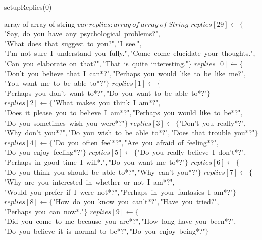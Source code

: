 \documentclass[a4paper,10pt]{article}
\begin{document}
\begin{algorithm}
\caption{setupReplies(0)}
\begin{algorithmic}[5]
\State {}
\State {}
\State {}
    \State array of array of string
  \EndDecl
  \State \(var\ replies:array\ of\ array\ of\ String\)
  \State {}
  \State {}
  \State \(replies[29]\gets\{\)"{}Say,\ do\ you\ have\ any\ psychological\ problems?"{}\(,\)"{}What\ does\ that\ suggest\ to\ you?"{}\(,\)"{}I\ see."{}\(,\)"{}I'{}m\ not\ sure\ I\ understand\ you\ fully."{}\(,\)"{}Come\ come\ elucidate\ your\ thoughts."{}\(,\)"{}Can\ you\ elaborate\ on\ that?"{}\(,\)"{}That\ is\ quite\ interesting."{}\(\}\)
  \State \(replies[0]\gets\{\)"{}Don'{}t\ you\ believe\ that\ I\ can*?"{}\(,\)"{}Perhaps\ you\ would\ like\ to\ be\ like\ me?"{}\(,\)"{}You\ want\ me\ to\ be\ able\ to*?"{}\(\}\)
  \State \(replies[1]\gets\{\)"{}Perhaps\ you\ don'{}t\ want\ to*?"{}\(,\)"{}Do\ you\ want\ to\ be\ able\ to*?"{}\(\}\)
  \State \(replies[2]\gets\{\)"{}What\ makes\ you\ think\ I\ am*?"{}\(,\)"{}Does\ it\ please\ you\ to\ believe\ I\ am*?"{}\(,\)"{}Perhaps\ you\ would\ like\ to\ be*?"{}\(,\)"{}Do\ you\ sometimes\ wish\ you\ were*?"{}\(\}\)
  \State \(replies[3]\gets\{\)"{}Don'{}t\ you\ really*?"{}\(,\)"{}Why\ don'{}t\ you*?"{}\(,\)"{}Do\ you\ wish\ to\ be\ able\ to*?"{}\(,\)"{}Does\ that\ trouble\ you*?"{}\(\}\)
  \State \(replies[4]\gets\{\)"{}Do\ you\ often\ feel*?"{}\(,\)"{}Are\ you\ afraid\ of\ feeling*?"{}\(,\)"{}Do\ you\ enjoy\ feeling*?"{}\(\}\)
  \State \(replies[5]\gets\{\)"{}Do\ you\ really\ believe\ I\ don'{}t*?"{}\(,\)"{}Perhaps\ in\ good\ time\ I\ will*."{}\(,\)"{}Do\ you\ want\ me\ to*?"{}\(\}\)
  \State \(replies[6]\gets\{\)"{}Do\ you\ think\ you\ should\ be\ able\ to*?"{}\(,\)"{}Why\ can'{}t\ you*?"{}\(\}\)
  \State \(replies[7]\gets\{\)"{}Why\ are\ you\ interested\ in\ whether\ or\ not\ I\ am*?"{}\(,\)"{}Would\ you\ prefer\ if\ I\ were\ not*?"{}\(,\)"{}Perhaps\ in\ your\ fantasies\ I\ am*?"{}\(\}\)
  \State \(replies[8]\gets\{\)"{}How\ do\ you\ know\ you\ can'{}t*?"{}\(,\)"{}Have\ you\ tried?"{}\(,\)"{}Perhaps\ you\ can\ now*."{}\(\}\)
  \State \(replies[9]\gets\{\)"{}Did\ you\ come\ to\ me\ because\ you\ are*?"{}\(,\)"{}How\ long\ have\ you\ been*?"{}\(,\)"{}Do\ you\ believe\ it\ is\ normal\ to\ be*?"{}\(,\)"{}Do\ you\ enjoy\ being*?"{}\(\}\)

\end{algorithmic}
\end{algorithm}
\end{document}
